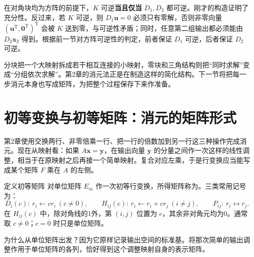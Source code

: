 \documentclass[a4paper,12pt,twoside,openany,fontset=none]{ctexbook}
\newcounter{definition}[chapter]
\newenvironment{definition}[1][]{\begin{defBox}{定义}{#1}}{\end{defBox}}
\numberwithin{equation}{chapter}
\begin{document}
在对角块均为方阵的前提下，$K$ 可逆\textbf{当且仅当} $D_1,D_2$ 都可逆。刚才的构造证明了充分性。反过来，若 $K$ 可逆，则 $D_1\boldsymbol u=0$ 必须只有零解，否则非零向量 $(\boldsymbol u^{\mathrm T},\boldsymbol0^{\mathrm T})^{\mathrm T}$ 会被 $K$ 送到零，与可逆性矛盾；同时，任意第二组输出都必须能由 $D_2\boldsymbol x_2$ 得到。根据前一节对方阵可逆性的判定，前者保证 $D_1$ 可逆，后者保证 $D_2$ 可逆。

分块把一个大映射拆成若干相互连接的小映射，零块和三角结构则把“同时求解”变成“分组依次求解”。第2章的消元法正是在制造这样的简化结构。下一节将把每一步消元本身也写成矩阵，为把整个过程保存下来作准备。

\section{初等变换与初等矩阵：消元的矩阵形式}
\label{sec:three-elementary}

第2章使用交换两行、非零倍乘一行、把一行的倍数加到另一行这三种操作完成消元。现在从映射看：如果 $A\boldsymbol x=\boldsymbol y$，在输出向量 $\boldsymbol y$ 的分量之间作一次这样的线性调整，相当于在原映射之后再接一个简单映射。复合对应左乘，于是行变换应当能写成某个矩阵 $F$ 乘在 $A$ 的左侧。

\begin{definition}[初等矩阵]
对单位矩阵 $E_m$ 作一次初等行变换，所得矩阵称为。三类常用记号为：
\[
 D_i(c):\ r_i\leftarrow c r_i\ (c\ne0),\qquad
 H_{ij}(c):\ r_i\leftarrow r_i+c r_j\ (i\ne j),\qquad
 P_{ij}:\ r_i\leftrightarrow r_j.
\]
在 $H_{ij}(c)$ 中，除对角线的1外，第 $(i,j)$ 位置为 $c$，其余非对角元均为0。通常取 $c\ne0$；$c=0$ 时只是单位矩阵。
\end{definition}

为什么从单位矩阵出发？因为它原样记录输出空间的标准基。将那次简单的输出调整作用于单位矩阵的各列，恰好得到这个调整映射自身的表示矩阵。

\end{document}

